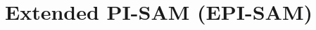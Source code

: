 \documentclass[letterpaper]{article} %
\newcommand{\tuple}[1]{\ensuremath{\left \langle #1 \right \rangle }}
\newcommand{\pre}{\textit{pre}}
\newcommand{\pisam}{\textit{PI-SAM}\xspace}
\newtheorem{observation}[theorem]{Observation}
\begin{document}




\section{Extended PI-SAM (EPI-SAM)}


    
\end{document}
